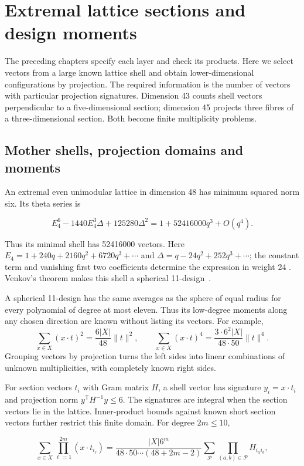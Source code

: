 \section{Extremal lattice sections and design moments}
\label{sec:sections}

The preceding chapters specify each layer and check its products. Here we
select vectors from a large known lattice shell and obtain lower-dimensional
configurations by projection. The required information is the number of
vectors with particular projection signatures. Dimension 43 counts shell
vectors perpendicular to a five-dimensional section; dimension 45 projects
three fibres of a three-dimensional section. Both become finite multiplicity
problems.

\subsection{Mother shells, projection domains and
moments}

An extremal even unimodular lattice in dimension 48 has minimum squared
norm six. Its theta series is

\[
E_4^6-1440E_4^3\Delta+125280\Delta^2
=1+52416000q^3+O(q^4).
\]

Thus its minimal shell has 52416000 vectors. Here
\(E_4=1+240q+2160q^2+6720q^3+\cdots\) and
\(\Delta=q-24q^2+252q^3+\cdots\); the constant term and vanishing first
two coefficients determine the expression in weight 24
\cite{conway1999sphere}. Venkov's theorem makes this shell a spherical
11-design~\cite[Theorem 4.1]{nebe-designs}.

A spherical 11-design has the same averages as the sphere of equal radius
for every polynomial of degree at most eleven. Thus its low-degree moments
along any chosen direction are known without listing its vectors. For example,
\[
\sum_{x\in X}(x\cdot t)^2=\frac{6|X|}{48}\|t\|^2,\qquad
\sum_{x\in X}(x\cdot t)^4=\frac{3\cdot6^2|X|}{48\cdot50}\|t\|^4.
\]
Grouping vectors by projection turns the left sides into linear combinations
of unknown multiplicities, with completely known right sides.

For section vectors \(t_i\) with Gram matrix \(H\), a shell vector has
signature \(y_i=x\cdot t_i\) and projection norm
\(y^{\mathsf T}H^{-1}y\le6\). The signatures are integral when the
section vectors lie in the lattice. Inner-product bounds against known
short section vectors further restrict this finite domain. For degree
\(2m\le10\),

\[
\sum_{x\in X}\prod_{\ell=1}^{2m}(x\cdot t_{i_\ell})
=\frac{|X|6^m}{48\cdot50\cdots(48+2m-2)}
\sum_{\mathcal P}\prod_{(a,b)\in\mathcal P}H_{i_ai_b},
\]

